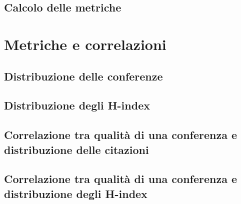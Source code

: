 \subsection{Calcolo delle metriche}


\section{Metriche e correlazioni}\label{sec:metriche-correlazioni}


\subsection{Distribuzione delle conferenze}

\subsection{Distribuzione degli H-index}

\subsection{Correlazione tra qualità di una conferenza e distribuzione delle citazioni}

\subsection{Correlazione tra qualità di una conferenza e distribuzione degli H-index}
